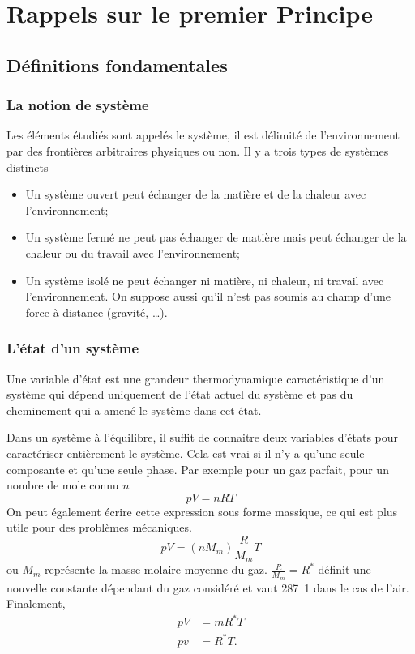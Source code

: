 \section{Rappels sur le premier Principe}
\subsection{Définitions fondamentales}
\subsubsection{La notion de système}
Les éléments étudiés sont appelés le système,
il est délimité de l'environnement par des
frontières arbitraires physiques ou non.
Il y a trois types de systèmes distincts
\begin{itemize}
  \item Un système ouvert peut échanger de la matière et
    de la chaleur avec l'environnement;
  \item Un système fermé ne peut pas échanger de matière
    mais peut échanger de la chaleur ou du travail avec l'environnement;
  \item Un système isolé ne peut échanger ni matière,
    ni chaleur, ni travail avec l'environnement.
    On suppose aussi qu'il n'est pas soumis au champ
    d'une force à distance (gravité, \ldots).
\end{itemize}

\subsubsection{L'état d'un système}
Une variable d'état est une grandeur thermodynamique caractéristique
d'un système qui dépend uniquement de l'état actuel du système et
pas du cheminement qui a amené le système dans cet état.

Dans un système à l'équilibre, il suffit de connaitre deux variables d'états
pour caractériser entièrement le système.
Cela est vrai si il n'y a qu'une seule composante et qu'une seule phase.
Par exemple pour un gaz parfait, pour un nombre de mole connu $n$
\[ pV = nRT \]
On peut également écrire cette expression sous forme massique,
ce qui est plus utile pour des problèmes mécaniques.
\[ pV = (nM_m) \frac R {M_m} T \]
ou $M_m$ représente la masse molaire moyenne du gaz.
$\frac{R}{M_m} = R^*$ définit une nouvelle constante dépendant du gaz considéré
et vaut \si{287.1}{\joule\per\kilogram\kelvin} dans le cas de l'air.
Finalement,
\begin{align*}
  pV & = mR^*T\\
  pv & = R^*T.
\end{align*}

